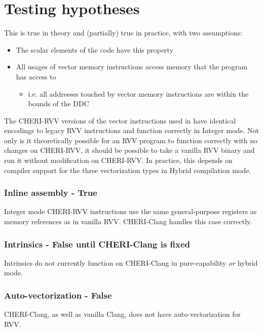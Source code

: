 \section{Testing hypotheses}


This is true in theory and (partially) true in practice, with two assumptions:
\begin{itemize}
    \item The scalar elements of the code have this property
    \item All usages of vector memory instructions access memory that the program has access to
    \begin{itemize}
        \item i.e. all addresses touched by vector memory instructions are within the bounds of the DDC
    \end{itemize}
\end{itemize}

The CHERI-RVV versions of the vector instructions used in  have identical encodings to legacy RVV instructions and function correctly in Integer mode.
Not only is it theoretically possible for an RVV program to function correctly with no changes on CHERI-RVV, it should be possible to take a vanilla RVV binary and run it without modification on CHERI-RVV.
In practice, this depends on compiler support for the three vectorization types in Hybrid compilation mode.

\subsubsection*{Inline assembly - True}
Integer mode CHERI-RVV instructions use the same general-purpose registers as memory references as in vanilla RVV.
CHERI-Clang handles this case correctly.

\subsubsection*{Intrinsics - False until CHERI-Clang is fixed}
Intrinsics do not currently function on CHERI-Clang in pure-capability \emph{or} hybrid mode.

\subsubsection*{Auto-vectorization - False}
CHERI-Clang, as well as vanilla Clang, does not have auto-vectorization for RVV.

